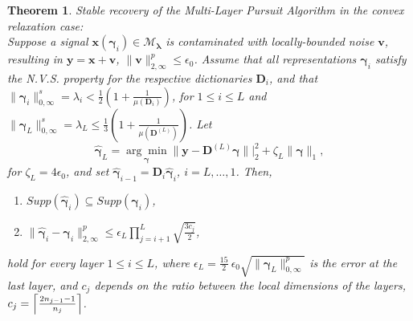 \documentclass[10pt,journal]{IEEEtran}
\def\x{{\mathbf x}}
\def\v{{\mathbf v}}
\def\y{{\mathbf y}}
\def\D{{\mathbf D}}
\def\M{{\mathcal{M}}}
\def\gama{{\boldsymbol \gamma}}
\def\lamda{{\boldsymbol \lambda}}
\theoremstyle{plain}
\newtheorem{thm}{Theorem} %
\theoremstyle{definition}
\begin{document}
\begin{thm}{Stable recovery of the Multi-Layer Pursuit Algorithm in the convex relaxation case:} \label{Thm:StabilityPursuitLasso} \\
	Suppose a signal $\x(\gama_i) \in \M_\lamda$ is contaminated with locally-bounded noise $\v$, resulting in $\y = \x + \v$, $\|\v\|^p_{2,\infty} \leq \epsilon_0$. Assume that all representations $\gama_i$ satisfy the N.V.S. property for the respective dictionaries $\D_i$, and that $\|\gama_i\|^s_{0,\infty} = \lambda_i < \frac{1}{2}\left(1+\frac{1}{\mu(\D_i)}\right)$, for $1\leq i \leq L$ and $\|\gama_L\|^s_{0,\infty} = \lambda_L \leq \frac{1}{3}\left(1+\frac{1}{\mu(\D^{(L)})}\right)$. Let
	\begin{equation}
		\hat{\gama}_L = \underset{\gama}{\arg\min} \| \y - \D^{(L)} \gama \||^2_2 + \zeta_L \|\gama\|_1,
	\end{equation}
	for $\zeta_L = 4\epsilon_0$, and set $\hat{\gama}_{i-1} = \D_i\hat{\gama}_i$, $i=L,\dots,1$.  Then,
	\begin{enumerate}
		\item $Supp(\hat{\gama}_i) \subseteq Supp(\gama_i)$,
		\item $\|\hat{\gama}_i - \gama_i\|^p_{2,\infty} \leq \epsilon_L  \displaystyle\prod\limits_{j=i+1}^{L} \sqrt{\frac{3 c_j}{2}}$,
	\end{enumerate}
	hold for every layer $1\leq i\leq L$, where $\epsilon_L = \frac{15}{2}\ \epsilon_0 \sqrt{\|\gama_L\|^p_{0,\infty}}$ is the error at the last layer, and  $c_j$ depends on the ratio between the local dimensions of the layers, $c_j = \Bigl\lceil \frac{2n_{j-1}-1}{n_j} \Bigr\rceil$.
\end{thm}
\end{document}

